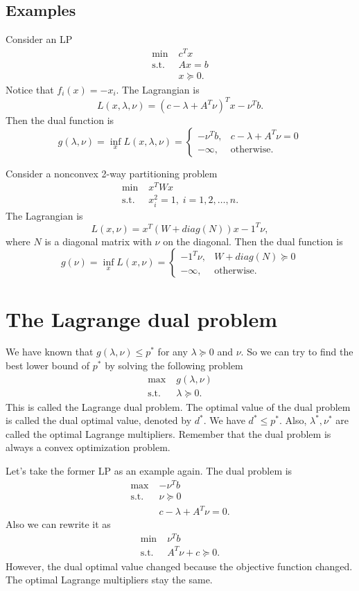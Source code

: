 \documentclass[lang=en,color=blue,mode=fancy,titlestyle=hang]{elegantbook}
\begin{document}
\subsection{Examples}
Consider an LP
\begin{align*}
\min \; &c^T x\\
\text{s.t.} \; &Ax = b\\
&x \succeq 0.
\end{align*}
Notice that $f_i(x) = -x_i$. The Lagrangian is
\[
L(x, \lambda, \nu) = (c - \lambda + A^T \nu)^T x - \nu^T b.
\]
Then the dual function is
\[
g(\lambda, \nu) = \inf_{x} L(x, \lambda, \nu) =
\begin{cases}
- \nu^T b, & c - \lambda + A^T \nu = 0\\
- \infty, & \text{otherwise}.
\end{cases}
\]

Consider a nonconvex 2-way partitioning problem
\begin{align*}
\min \; &x^T W x\\
\text{s.t.} \; &x_i^2 = 1, \; i = 1, 2, \ldots, n.
\end{align*}
The Lagrangian is
\[
L(x, \nu) =  x^T (W + diag(N)) x - 1^T \nu,
\]
where $N$ is a diagonal matrix with $\nu$ on the diagonal. Then the dual function is
\[
g(\nu) = \inf_{x} L(x, \nu) =
\begin{cases}
- 1^T \nu, & W + diag(N) \succeq 0\\
- \infty, & \text{otherwise}.
\end{cases}
\]

\section{The Lagrange dual problem}

We have known that $g(\lambda, \nu) \leq p^*$ for any $\lambda \succeq 0$ and $\nu$.
So we can try to find the best lower bound of $p^*$ by solving the following problem
\begin{align*}
\max \; &g(\lambda, \nu)\\
\text{s.t.} \; &\lambda \succeq 0.
\end{align*}
This is called the Lagrange dual problem. The optimal value of the dual problem is called
the dual optimal value, denoted by $d^*$. We have $d^* \leq p^*$. Also, $\lambda^*, \nu^*$
are called the optimal Lagrange multipliers. Remember that the dual problem is always a
convex optimization problem.

Let's take the former LP as an example again. The dual problem is
\begin{align*}
\max \; &- \nu^T b\\
\text{s.t.} \; &\nu \succeq 0\\
&c - \lambda + A^T \nu = 0.
\end{align*}
Also we can rewrite it as
\begin{align*}
\min \; & \nu^T b\\
\text{s.t.} \; &A^T \nu + c\succeq 0.
\end{align*}
However, the dual optimal value changed because the objective function changed. The optimal
Lagrange multipliers stay the same.
\end{document}
